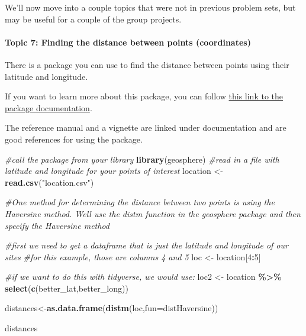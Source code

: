 \documentclass[
]{article}
\newenvironment{Shaded}{\begin{snugshade}}{\end{snugshade}}
\newcommand{\AttributeTok}[1]{\textcolor[rgb]{0.13,0.29,0.53}{#1}}
\newcommand{\CommentTok}[1]{\textcolor[rgb]{0.56,0.35,0.01}{\textit{#1}}}
\newcommand{\DecValTok}[1]{\textcolor[rgb]{0.00,0.00,0.81}{#1}}
\newcommand{\FunctionTok}[1]{\textcolor[rgb]{0.13,0.29,0.53}{\textbf{#1}}}
\newcommand{\NormalTok}[1]{#1}
\newcommand{\OtherTok}[1]{\textcolor[rgb]{0.56,0.35,0.01}{#1}}
\newcommand{\SpecialCharTok}[1]{\textcolor[rgb]{0.81,0.36,0.00}{\textbf{#1}}}
\newcommand{\StringTok}[1]{\textcolor[rgb]{0.31,0.60,0.02}{#1}}
\begin{document}
We'll now move into a couple topics that were not in previous problem
sets, but may be useful for a couple of the group projects.

\hypertarget{topic-7-finding-the-distance-between-points-coordinates}{%
\paragraph{Topic 7: Finding the distance between points
(coordinates)}\label{topic-7-finding-the-distance-between-points-coordinates}}

There is a package you can use to find the distance between points using
their latitude and longitude.

If you want to learn more about this package, you can follow
\href{https://cran.r-project.org/web/packages/geosphere/index.html}{this
link to the package documentation}.

The reference manual and a vignette are linked under documentation and
are good references for using the package.

\begin{Shaded}
\begin{Highlighting}[]
\CommentTok{\#call the package from your library}
\FunctionTok{library}\NormalTok{(geosphere)}
\CommentTok{\#read in a file with latitude and longitude for your points of interest}
\NormalTok{location }\OtherTok{\textless{}{-}} \FunctionTok{read.csv}\NormalTok{(}\StringTok{"location.csv"}\NormalTok{)}

\CommentTok{\#One method for determining the distance between two points is using the Haversine method. We\textquotesingle{}ll use the distm function in the geosphere package and then specify the Haversine method}

\CommentTok{\#first we need to get a dataframe that is just the latitude and longitude of our sites}
\CommentTok{\#for this example, those are columns 4 and 5}
\NormalTok{loc }\OtherTok{\textless{}{-}}\NormalTok{ location[}\DecValTok{4}\SpecialCharTok{:}\DecValTok{5}\NormalTok{]}

\CommentTok{\#if we want to do this with tidyverse, we would use:}
\NormalTok{loc2 }\OtherTok{\textless{}{-}}\NormalTok{ location }\SpecialCharTok{\%\textgreater{}\%} \FunctionTok{select}\NormalTok{(}\FunctionTok{c}\NormalTok{(better\_lat,better\_long))}

\NormalTok{distances}\OtherTok{\textless{}{-}}\FunctionTok{as.data.frame}\NormalTok{(}\FunctionTok{distm}\NormalTok{(loc,}\AttributeTok{fun=}\NormalTok{distHaversine))}

\NormalTok{distances}
\end{Highlighting}
\end{Shaded}
\end{document}
